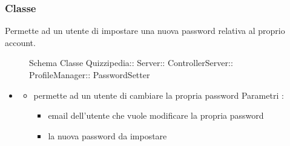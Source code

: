 \subsubsection{Classe }
Permette ad un utente di impostare una nuova password relativa al proprio account.
\begin{figure}[H]
\centering
\noindent{}
\caption[Schema Classe PasswordSetter]{Schema Classe Quizzipedia:: Server:: ControllerServer:: ProfileManager:: PasswordSetter}
\end{figure}
\begin{itemize}
\item {}
\begin{itemize}
\item {}
\newline
permette ad un utente di cambiare la propria password
\newline
Parametri :
\begin{itemize}
\item {}
\newline
email dell'utente che vuole modificare la propria password
\item {}
\newline
la nuova password da impostare
\end{itemize}
\end{itemize}
\end{itemize}

